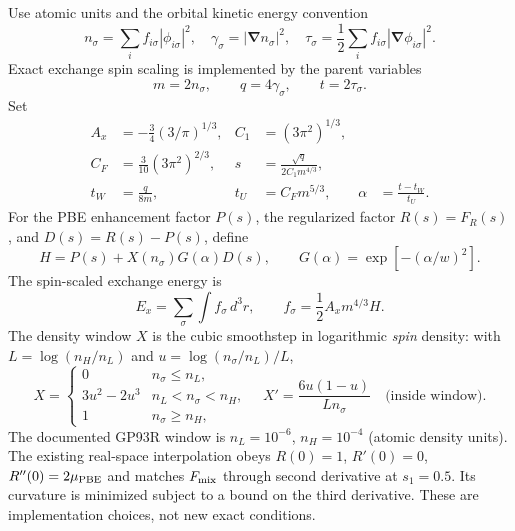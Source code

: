 \documentclass[11pt,a4paper]{article}
\newcommand{\dd}{\,d^3r}
\newcommand{\grad}{\boldsymbol\nabla}
\begin{document}
Use atomic units and the orbital kinetic energy convention
\begin{equation}
n_\sigma=\sum_i f_{i\sigma}|\phi_{i\sigma}|^2,\quad
\gamma_\sigma=|\grad n_\sigma|^2,\quad
\tau_\sigma=\frac12\sum_i f_{i\sigma}|\grad\phi_{i\sigma}|^2.
\end{equation}
Exact exchange spin scaling is implemented by the parent variables
\begin{equation}
m=2n_\sigma,\qquad q=4\gamma_\sigma,\qquad t=2\tau_\sigma.
\end{equation}
Set
\begin{align}
A_x&=-\tfrac34(3/\pi)^{1/3},& C_1&=(3\pi^2)^{1/3},\\
C_F&=\tfrac3{10}(3\pi^2)^{2/3},&s&=\frac{\sqrt q}{2C_1m^{4/3}},\\
t_W&=\frac{q}{8m},&t_U&=C_Fm^{5/3},&
\alpha&=\frac{t-t_W}{t_U}.
\end{align}
For the PBE enhancement factor $P(s)$, the regularized factor $R(s)=F_R(s)$, and $D(s)=R(s)-P(s)$, define
\begin{equation}
H=P(s)+X(n_\sigma)G(\alpha)D(s),\qquad G(\alpha)=\exp[-(\alpha/w)^2].
\end{equation}
The spin-scaled exchange energy is
\begin{equation}\boxed{E_x=\sum_\sigma\int f_\sigma\dd,\qquad f_\sigma=\frac12A_xm^{4/3}H.}\label{eq:energy}\end{equation}
The density window $X$ is the cubic smoothstep in logarithmic \emph{spin} density: with $L=\log(n_H/n_L)$ and $u=\log(n_\sigma/n_L)/L$,
\begin{equation}
X=\begin{cases}0&n_\sigma\le n_L,\\3u^2-2u^3&n_L<n_\sigma<n_H,\\1&n_\sigma\ge n_H,\end{cases}\quad
X'=\frac{6u(1-u)}{Ln_\sigma}\quad\text{(inside window)}.
\end{equation}
The documented GP93R window is $n_L=10^{-6}$, $n_H=10^{-4}$ (atomic density units). The existing real-space interpolation obeys $R(0)=1$, $R'(0)=0$, $R''(0)=2\mu_{\rm PBE}$ and matches $F_{\rm mix}$ through second derivative at $s_1=0.5$. Its curvature is minimized subject to a bound on the third derivative. These are implementation choices, not new exact conditions.
\end{document}

